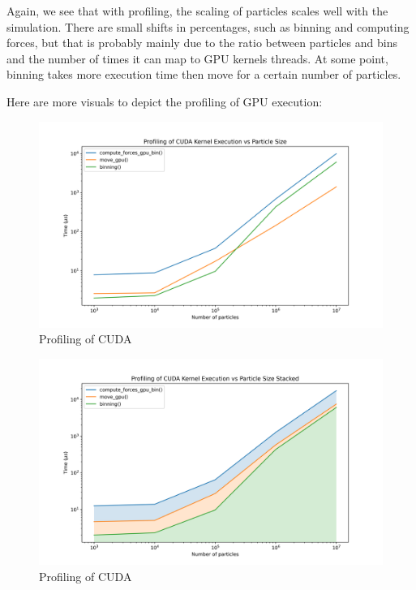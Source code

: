 \documentclass{article}
\begin{document}
Again, we see that with profiling, the scaling of particles scales well with the simulation. There are small shifts in percentages, such as binning and computing forces, but that is probably mainly due to the ratio between particles and bins and the number of times it can map to GPU kernels threads. At some point, binning takes more execution time then move for a certain number of particles. 

Here are more visuals to depict the profiling of GPU execution: \\
\begin{figure}[H]
    \centerline{\includegraphics[width=6in]{figures/profiling.png}}
    \caption{Profiling of CUDA}
    \label{fig:profile}
\end{figure}


\begin{figure}[H]
    \centerline{\includegraphics[width=6in]{figures/profiling-stacked.png}}
    \caption{Profiling of CUDA}
    \label{fig:profile-stacked}
\end{figure}
\end{document}
